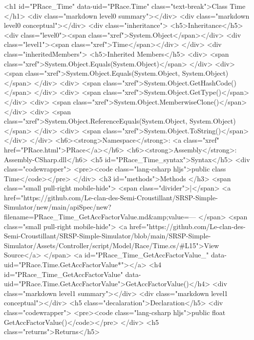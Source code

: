   
  <h1 id="PRace_Time" data-uid="PRace.Time" class="text-break">Class Time
  </h1>
  <div class="markdown level0 summary"></div>
  <div class="markdown level0 conceptual"></div>
  <div class="inheritance">
    <h5>Inheritance</h5>
    <div class="level0"><span class="xref">System.Object</span></div>
    <div class="level1"><span class="xref">Time</span></div>
  </div>
  <div class="inheritedMembers">
    <h5>Inherited Members</h5>
    <div>
      <span class="xref">System.Object.Equals(System.Object)</span>
    </div>
    <div>
      <span class="xref">System.Object.Equals(System.Object, System.Object)</span>
    </div>
    <div>
      <span class="xref">System.Object.GetHashCode()</span>
    </div>
    <div>
      <span class="xref">System.Object.GetType()</span>
    </div>
    <div>
      <span class="xref">System.Object.MemberwiseClone()</span>
    </div>
    <div>
      <span class="xref">System.Object.ReferenceEquals(System.Object, System.Object)</span>
    </div>
    <div>
      <span class="xref">System.Object.ToString()</span>
    </div>
  </div>
  <h6><strong>Namespace</strong>: <a class="xref" href="PRace.html">PRace</a></h6>
  <h6><strong>Assembly</strong>: Assembly-CSharp.dll</h6>
  <h5 id="PRace_Time_syntax">Syntax</h5>
  <div class="codewrapper">
    <pre><code class="lang-csharp hljs">public class Time</code></pre>
  </div>
  <h3 id="methods">Methods
  </h3>
  <span class="small pull-right mobile-hide">
    <span class="divider">|</span>
    <a href="https://github.com/Le-clan-des-Semi-Croustillant/SRSP-Simple-Simulator/new/main/apiSpec/new?filename=PRace_Time_GetAccFactorValue.md&amp;value=---%
  </span>
  <span class="small pull-right mobile-hide">
    <a href="https://github.com/Le-clan-des-Semi-Croustillant/SRSP-Simple-Simulator/blob/main/SRSP-Simple-Simulator/Assets/Controller/script/Model/Race/Time.cs/#L15">View Source</a>
  </span>
  <a id="PRace_Time_GetAccFactorValue_" data-uid="PRace.Time.GetAccFactorValue*"></a>
  <h4 id="PRace_Time_GetAccFactorValue" data-uid="PRace.Time.GetAccFactorValue">GetAccFactorValue()</h4>
  <div class="markdown level1 summary"></div>
  <div class="markdown level1 conceptual"></div>
  <h5 class="decalaration">Declaration</h5>
  <div class="codewrapper">
    <pre><code class="lang-csharp hljs">public float GetAccFactorValue()</code></pre>
  </div>
  <h5 class="returns">Returns</h5>
